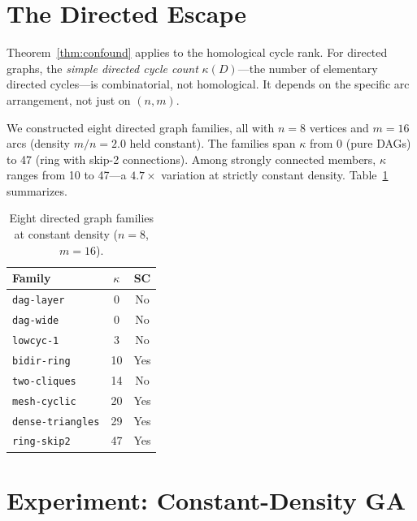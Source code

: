 \documentclass[10pt,twocolumn]{article}
\begin{document}
\section{The Directed Escape}
\label{sec:escape}

Theorem~\ref{thm:confound} applies to the homological cycle rank. For
directed graphs, the \emph{simple directed cycle count} $\kappa(D)$---the
number of elementary directed cycles---is combinatorial, not homological.
It depends on the specific arc arrangement, not just on $(n, m)$.

We constructed eight directed graph families, all with $n = 8$ vertices and
$m = 16$ arcs (density $m/n = 2.0$ held constant). The families span
$\kappa$ from 0 (pure DAGs) to 47 (ring with skip-2 connections). Among
strongly connected members, $\kappa$ ranges from 10 to 47---a $4.7\times$
variation at strictly constant density. Table~\ref{tab:families} summarizes.

\begin{table}[t]
\centering
\caption{Eight directed graph families at constant density ($n=8$, $m=16$).}
\label{tab:families}
\small
\begin{tabular}{lcc}
\toprule
\textbf{Family} & $\kappa$ & \textbf{SC} \\
\midrule
\texttt{dag-layer}       &  0 & No  \\
\texttt{dag-wide}        &  0 & No  \\
\texttt{lowcyc-1}        &  3 & No  \\
\texttt{bidir-ring}      & 10 & Yes \\
\texttt{two-cliques}     & 14 & No  \\
\texttt{mesh-cyclic}     & 20 & Yes \\
\texttt{dense-triangles} & 29 & Yes \\
\texttt{ring-skip2}      & 47 & Yes \\
\bottomrule
\end{tabular}
\end{table}

\section{Experiment: Constant-Density GA}
\label{sec:experiment}
\end{document}
